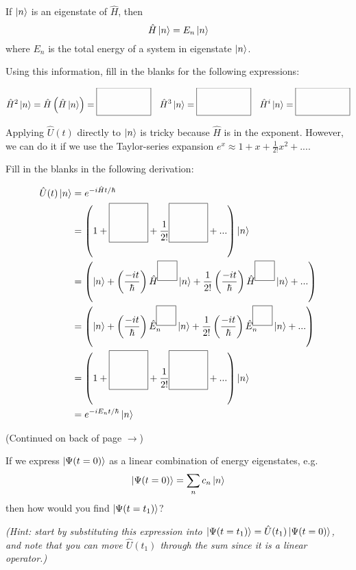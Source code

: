 	\begin{questions}
	
		\vspace{0.2in}
		\question If $\ket{n}$ is an eigenstate of $\hat H$, then
			\begin{equation*}
				\hat H\ket{n} = E_n\ket{n}
			\end{equation*}	
			where $E_n$ is the total energy of a system in eigenstate $\ket{n}$.
			
			Using this information, fill in the blanks for the following expressions:
			
			\begin{align*}
				\hat H^2\ket{n} = \hat H \left(\hat H \ket{n}\right) =  \raisebox{-2ex}{\framebox(60,30){}} & & \hat H^3 \ket{n} =   \raisebox{-2ex}{\framebox(60,30){}} & & \hat H^i \ket{n} =  \raisebox{-2ex}{\framebox(60,30){}}
			\end{align*}
			
			\vspace{0.1in}
		\question Applying $\hat U(t)$ directly to $\ket{n}$ is tricky because $\hat H$ is in the exponent. However, we can do it if we use the Taylor-series expansion $e^x \approx 1 + x + \frac{1}{2!} x^2 + ...$.
		
			Fill in the blanks in the following derivation:
			
			\begin{align*}
				\hat U(t)\ket{n} &= e^{-i\hat H t/\hbar}\\
				&= \left(1 + \raisebox{-2ex}{\framebox(40,40){}} + \frac{1}{2!}\raisebox{-2ex}{\framebox(40,40){}}  + ...\right)\ket{n}\\
				&= \left( \ket{n} + \left(\frac{-it}{\hbar}\right)\hat H^{\framebox(20,20){}}\ket{n} + \frac{1}{2!} \left(\frac{-it}{\hbar}\right)\hat H^{\framebox(20,20){}}\ket{n} + ...\right)\\
				&= \left( \ket{n} + \left(\frac{-it}{\hbar}\right)\hat E_n^{\framebox(20,20){}}\ket{n} + \frac{1}{2!} \left(\frac{-it}{\hbar}\right)\hat E_n^{\framebox(20,20){}}\ket{n} + ...\right)\\
				&= \left(1 + \raisebox{-2ex}{\framebox(40,40){}} + \frac{1}{2!}\raisebox{-2ex}{\framebox(40,40){}}  + ...\right)\ket{n}\\
				&= e^{-i E_n t/\hbar}\ket{n}
			\end{align*}
			
			\vspace{0.2in}
			\begin{flushright}(Continued on back of page $\rightarrow$)	\end{flushright}
		
		\newpage
		\question If we express $\ket{\Psi(t=0)}$ as a linear combination of energy eigenstates, e.g.
			\begin{equation*}
				\ket{\Psi(t=0)} = \sum_n c_n \ket{n}
			\end{equation*}
			then how would you find $\ket{\Psi(t=t_1)}$?
			
			\emph{(Hint: start by substituting this expression into $\ket{\Psi(t=t_1)} = \hat U(t_1)\ket{\Psi(t=0)}$, and note that you can move $\hat U(t_1)$ through the sum since it is a linear operator.)}
	
	\end{questions}